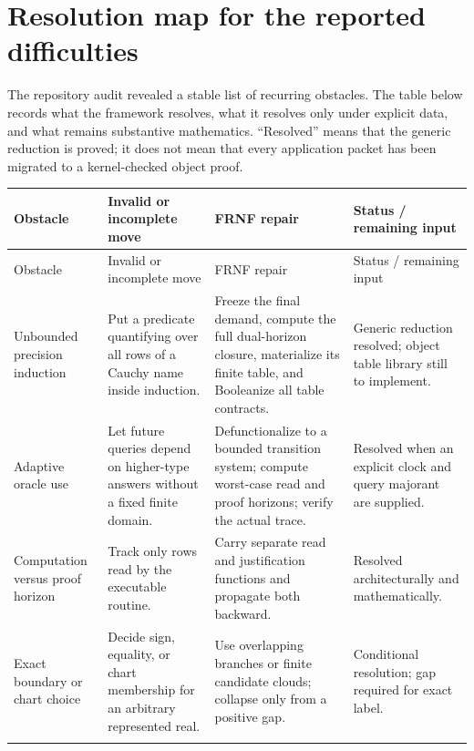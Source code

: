 \section{Resolution map for the reported difficulties}
\label{sec:resolution-map}

The repository audit revealed a stable list of recurring obstacles.  The table below
records what the framework resolves, what it resolves only under explicit data, and
what remains substantive mathematics.  ``Resolved'' means that the generic reduction
is proved; it does not mean that every application packet has been migrated to a
kernel-checked object proof.

\small
\begin{longtable}{@{}p{}p{}p{}p{}@{}}
\toprule
Obstacle & Invalid or incomplete move & FRNF repair & Status / remaining input \\
\midrule
\endfirsthead
\toprule
Obstacle & Invalid or incomplete move & FRNF repair & Status / remaining input \\
\midrule
\endhead

Unbounded precision induction & Put a predicate quantifying over all rows of a Cauchy
name inside induction. & Freeze the final demand, compute the full dual-horizon closure,
materialize its finite table, and Booleanize all table contracts. & Generic reduction
resolved; object table library still to implement. \\
\addlinespace

Adaptive oracle use & Let future queries depend on higher-type answers without a fixed
finite domain. & Defunctionalize to a bounded transition system; compute worst-case
read and proof horizons; verify the actual trace. & Resolved when an explicit clock and
query majorant are supplied. \\
\addlinespace

Computation versus proof horizon & Track only rows read by the executable routine. &
Carry separate read and justification functions and propagate both backward. & Resolved
architecturally and mathematically. \\
\addlinespace

Exact boundary or chart choice & Decide sign, equality, or chart membership for an
arbitrary represented real. & Use overlapping branches or finite candidate clouds;
collapse only from a positive gap. & Conditional resolution; gap required for exact
label. \\
\addlinespace


\end{longtable}
